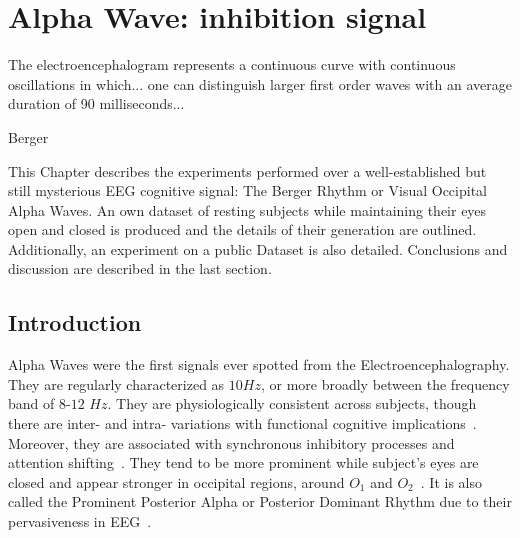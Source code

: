 \chapter{Alpha Wave: inhibition signal}
\label{chapter:four}
\epigraph{The electroencephalogram represents a continuous curve with continuous oscillations in which... one can distinguish larger first order waves with an average duration of 90 milliseconds...}{Berger}

This Chapter describes the experiments performed over a well-established but still mysterious EEG cognitive signal: The Berger Rhythm or Visual Occipital Alpha Waves.  An own dataset of resting subjects while maintaining their eyes open and closed is produced and the details of their generation are outlined.  Additionally, an experiment on a public Dataset is also detailed.  Conclusions and discussion are described in the last section.

\section{Introduction}


Alpha Waves were the first signals ever spotted from the Electroencephalography.  They are regularly characterized as $10\si{Hz}$, or more broadly between the frequency band of $8$-$12$ $\si{Hz}$. They are physiologically consistent across subjects, though there are inter- and intra- variations with functional cognitive implications~\cite{Haegens2014}.   Moreover, they are associated with synchronous inhibitory processes and attention shifting~\cite{c3}. They tend to be more prominent while subject's eyes are closed and appear stronger in occipital regions, around $O_1$ and $O_2$~\cite{c6,c11}. It is also called the Prominent Posterior Alpha or Posterior Dominant Rhythm due to their pervasiveness in EEG~\cite{Schomer2010,Haegens2014}.

